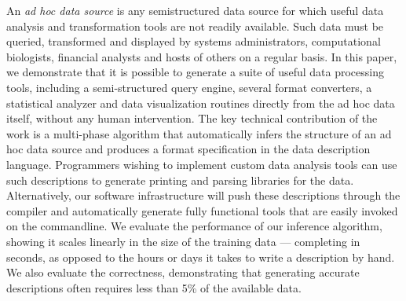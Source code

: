 An {\em ad hoc data source} is any semistructured data source for
which useful data analysis and transformation tools are not 
readily available.  Such data must be queried, transformed and displayed by
systems administrators, computational biologists, financial analysts
and hosts of others on a regular basis.  
In this paper, we demonstrate that it is possible to generate a suite
of useful data processing tools, including a semi-structured query
engine, several format converters, a statistical analyzer and data
visualization routines directly from the ad hoc data itself, 
without any human intervention.  
The key technical contribution of the work is a multi-phase algorithm
that automatically infers the structure of an ad hoc data source and
produces a format specification in the \pads{} data description
language.  
Programmers wishing to implement custom data analysis tools
can use such descriptions to generate printing and parsing libraries
for the data.  Alternatively,  our software infrastructure will
push these descriptions through the \pads{} compiler and automatically
generate fully functional tools that are easily invoked on the
commandline.  We evaluate the performance of
our inference algorithm, showing it scales linearly
in the size of the training data --- completing in seconds, as opposed
to the hours or days it takes to write a description by hand.
We also evaluate the correctness, demonstrating that 
generating accurate descriptions often requires less than 5\% of the
available data.